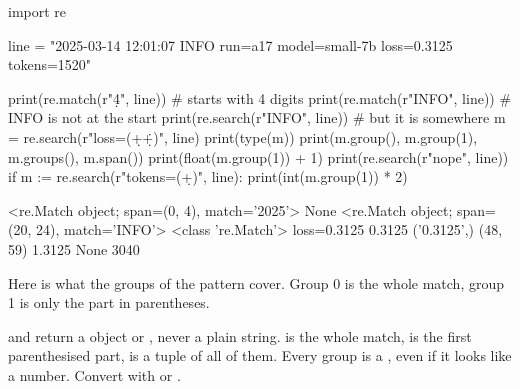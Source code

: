 \begin{pycode}
import re

line = "2025-03-14 12:01:07 INFO run=a17 model=small-7b loss=0.3125 tokens=1520"

print(re.match(r"\d{4}", line))      # starts with 4 digits
print(re.match(r"INFO", line))       # INFO is not at the start
print(re.search(r"INFO", line))      # but it is somewhere
m = re.search(r"loss=(\d+\.\d+)", line)
print(type(m))
print(m.group(), m.group(1), m.groups(), m.span())
print(float(m.group(1)) + 1)
print(re.search(r"nope", line))
if m := re.search(r"tokens=(\d+)", line):
    print(int(m.group(1)) * 2)
\end{pycode}
\begin{rawcode}
<re.Match object; span=(0, 4), match='2025'>
None
<re.Match object; span=(20, 24), match='INFO'>
<class 're.Match'>
loss=0.3125 0.3125 ('0.3125',) (48, 59)
1.3125
None
3040
\end{rawcode}

Here is what the groups of the  pattern cover. Group 0 is the whole match, group 1
is only the part in parentheses.

\begin{center}
\end{center}

\begin{typecheck}
 and  return a  object or , never a plain
string.  is the whole match,  is the first parenthesised
part,  is a tuple of all of them. Every group is a , even if it looks
like a number. Convert with  or .
\end{typecheck}

